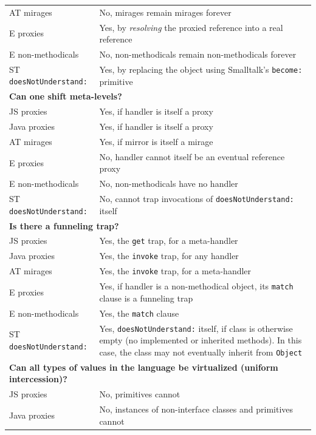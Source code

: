 \documentclass{acm_proc_article-sp}
\begin{document}
\begin{table}
\begin{tabular}{|p{}|p{}|}
    AT mirages        & No, mirages remain mirages forever\\
    E proxies         & Yes, by \emph{resolving} the proxied reference into a real reference\\
    E non-methodicals & No, non-methodicals remain non-methodicals forever\\
    ST \texttt{doesNotUnderstand:}  & Yes, by replacing the object using Smalltalk's \texttt{become:} primitive\\
    \hline
    \multicolumn{2}{|l|}{\textbf{Can one shift meta-levels?}}\\
    \hline
    JS proxies        & Yes, if handler is itself a proxy\\
    Java proxies      & Yes, if handler is itself a proxy\\
    AT mirages        & Yes, if mirror is itself a mirage\\
    E proxies         & No, handler cannot itself be an eventual reference proxy\\
    E non-methodicals & No, non-methodicals have no handler\\
    ST \texttt{doesNotUnderstand:}  & No, cannot trap invocations of \texttt{doesNotUnderstand:} itself\\
    \hline
    \multicolumn{2}{|l|}{\textbf{Is there a funneling trap?}}\\
    \hline
    JS proxies        & Yes, the \texttt{get} trap, for a meta-handler\\
    Java proxies      & Yes, the \texttt{invoke} trap, for any handler\\
    AT mirages        & Yes, the \texttt{invoke} trap, for a meta-handler\\
    E proxies         & Yes, if handler is a non-methodical object, its \texttt{match} clause is a funneling trap\\
    E non-methodicals & Yes, the \texttt{match} clause\\
    ST \texttt{doesNotUnderstand:}  & Yes, \texttt{doesNotUnderstand:} itself, if class is otherwise empty (no implemented or inherited methods). In this case, the class may not eventually inherit from \texttt{Object}\\
    \hline
    \multicolumn{2}{|l|}{\textbf{Can all types of values in the language be virtualized (uniform intercession)?}}\\
    \hline
    JS proxies        & No, primitives cannot\\
    Java proxies      & No, instances of non-interface classes and primitives cannot\\

\end{tabular}
\end{table}
\end{document}

